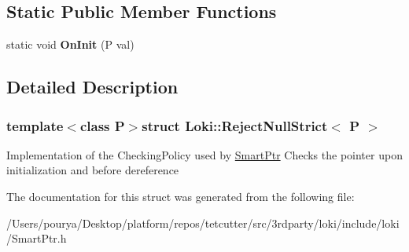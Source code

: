 \subsection*{Static Public Member Functions}
\begin{DoxyCompactItemize}
\item 
\hypertarget{structLoki_1_1RejectNullStrict_a3a172d04de8ed5eacae217676188735f}{}static void {\bfseries On\+Init} (P val)\label{structLoki_1_1RejectNullStrict_a3a172d04de8ed5eacae217676188735f}

\end{DoxyCompactItemize}


\subsection{Detailed Description}
\subsubsection*{template$<$class P$>$struct Loki\+::\+Reject\+Null\+Strict$<$ P $>$}

Implementation of the Checking\+Policy used by \hyperlink{classLoki_1_1SmartPtr}{Smart\+Ptr} Checks the pointer upon initialization and before dereference 

The documentation for this struct was generated from the following file\+:\begin{DoxyCompactItemize}
\item 
/\+Users/pourya/\+Desktop/platform/repos/tetcutter/src/3rdparty/loki/include/loki/Smart\+Ptr.\+h\end{DoxyCompactItemize}
